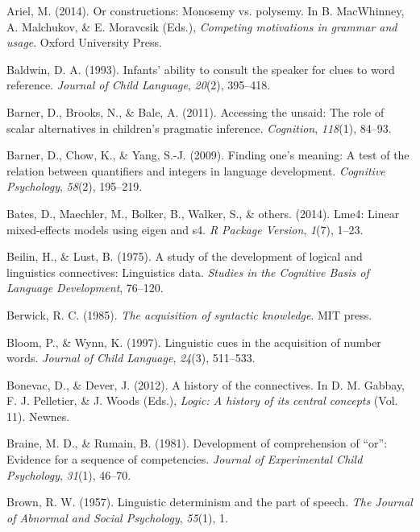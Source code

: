 \documentclass[oneside]{report}
\theoremstyle{definition}
\theoremstyle{definition}
\theoremstyle{definition}
\theoremstyle{remark}
\begin{document}
\hypertarget{ref-Ariel2014}{}
Ariel, M. (2014). Or constructions: Monosemy vs. polysemy. In B.
MacWhinney, A. Malchukov, \& E. Moravcsik (Eds.), \emph{Competing
motivations in grammar and usage}. Oxford University Press.

\hypertarget{ref-baldwin1993infants}{}
Baldwin, D. A. (1993). Infants' ability to consult the speaker for clues
to word reference. \emph{Journal of Child Language}, \emph{20}(2),
395--418.

\hypertarget{ref-barner2011accessing}{}
Barner, D., Brooks, N., \& Bale, A. (2011). Accessing the unsaid: The
role of scalar alternatives in children's pragmatic inference.
\emph{Cognition}, \emph{118}(1), 84--93.

\hypertarget{ref-barner2009finding}{}
Barner, D., Chow, K., \& Yang, S.-J. (2009). Finding one's meaning: A
test of the relation between quantifiers and integers in language
development. \emph{Cognitive Psychology}, \emph{58}(2), 195--219.

\hypertarget{ref-bates2014lme4}{}
Bates, D., Maechler, M., Bolker, B., Walker, S., \& others. (2014).
Lme4: Linear mixed-effects models using eigen and s4. \emph{R Package
Version}, \emph{1}(7), 1--23.

\hypertarget{ref-beilin1975study}{}
Beilin, H., \& Lust, B. (1975). A study of the development of logical
and linguistics connectives: Linguistics data. \emph{Studies in the
Cognitive Basis of Language Development}, 76--120.

\hypertarget{ref-berwick1985acquisition}{}
Berwick, R. C. (1985). \emph{The acquisition of syntactic knowledge}.
MIT press.

\hypertarget{ref-bloom1997linguistic}{}
Bloom, P., \& Wynn, K. (1997). Linguistic cues in the acquisition of
number words. \emph{Journal of Child Language}, \emph{24}(3), 511--533.

\hypertarget{ref-gabbay2012logic}{}
Bonevac, D., \& Dever, J. (2012). A history of the connectives. In D. M.
Gabbay, F. J. Pelletier, \& J. Woods (Eds.), \emph{Logic: A history of
its central concepts} (Vol. 11). Newnes.

\hypertarget{ref-braine1981development}{}
Braine, M. D., \& Rumain, B. (1981). Development of comprehension of
``or'': Evidence for a sequence of competencies. \emph{Journal of
Experimental Child Psychology}, \emph{31}(1), 46--70.

\hypertarget{ref-brown1957linguistic}{}
Brown, R. W. (1957). Linguistic determinism and the part of speech.
\emph{The Journal of Abnormal and Social Psychology}, \emph{55}(1), 1.
\end{document}
